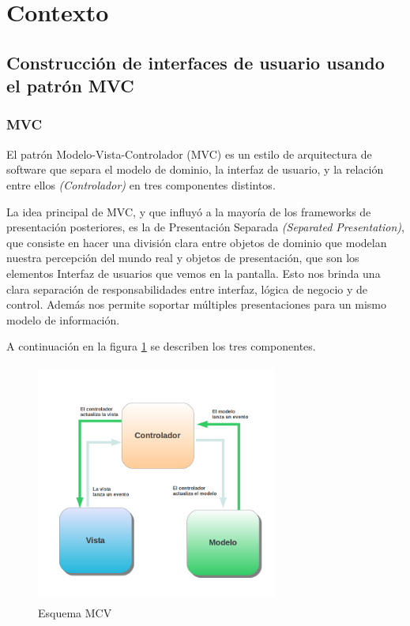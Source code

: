 \section{Contexto}
\subsection{Construcción de interfaces de usuario usando el patrón MVC}

	\subsubsection{MVC}
	El patrón Modelo-Vista-Controlador (MVC) es un estilo de arquitectura de
	software que separa el modelo de dominio, la interfaz de usuario,
	y la relación entre ellos \emph{(Controlador)} en tres componentes distintos.
	\cite{burbeck87}
	
	La idea principal de MVC, y que influyó a la mayoría de los frameworks de
	presentación posteriores, es la de Presentación Separada \emph{(Separated
	Presentation)}, que consiste en hacer una división clara entre objetos de 
	dominio que modelan nuestra percepción del mundo real y objetos de presentación, 
	que son los elementos Interfaz de usuarios que vemos en la pantalla. 
	Esto nos brinda una clara separación de responsabilidades entre interfaz,
	lógica de negocio y de control. Además nos permite soportar múltiples
	presentaciones para un mismo modelo de información. \cite{reenskaug79}
	\bigskip
	
	A continuación en la figura \ref{mvc} se describen los tres componentes.  
	
	\begin{figure}[h]
		\includegraphics[width=300px, height=300px]{img/mvc} 
		\caption{Esquema MCV}
		\label{mvc}
	\end{figure}  
	
